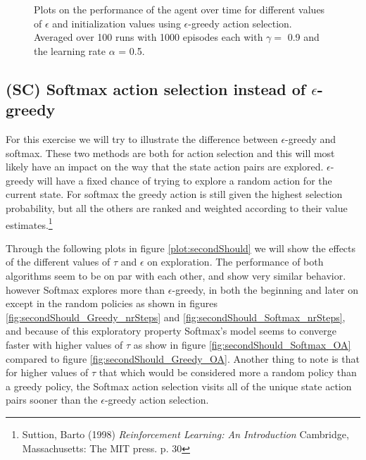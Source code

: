 \documentclass{article}
\begin{document}
\begin{figure}[ht]
{    \label{fig:secondMust_nrSteps_detail}
}
\caption{Plots on the performance of the agent over time for different values of $\epsilon$ and initialization values using $\epsilon$-greedy action selection. Averaged over 100 runs with 1000 episodes each with $\gamma = $ 0.9 and the learning rate $\alpha$ = 0.5.}
\label{plot:secondMust}
\end{figure}

\subsection{(SC) Softmax action selection instead of $\epsilon$-greedy}\label{sec:exercise3}
For this exercise we will try to illustrate the difference between $\epsilon$-greedy and softmax. These two methods are both for action selection and this will most likely have an impact on the way that the state action pairs are explored. $\epsilon$-greedy will have a fixed chance of trying to explore a random action for the current state. For softmax the greedy action is still given the highest selection probability, but all the others are ranked and weighted according to their value estimates.\footnote{Suttion, Barto (1998) \textit{Reinforcement Learning: An Introduction} Cambridge, Massachusetts: The MIT press. p. 30} 

Through the following plots in figure \ref{plot:secondShould} we will show the effects of the different values of $\tau$ and $\epsilon$ on exploration. The performance of both algorithms seem to be on par with each other, and show very similar behavior. however Softmax explores more than $\epsilon$-greedy, in both the beginning and later on except in the random policies as shown in figures \ref{fig:secondShould_Greedy_nrSteps} and \ref{fig:secondShould_Softmax_nrSteps}, and because of this exploratory property Softmax's model seems to converge faster with higher values of $\tau$ as show in figure \ref{fig:secondShould_Softmax_OA} compared to figure \ref{fig:secondShould_Greedy_OA}. Another thing to note is that for higher values of $\tau$ that which would be considered more a random policy than a greedy policy, the Softmax action selection visits all of the unique state action pairs sooner than the $\epsilon$-greedy action selection.
\end{document}
